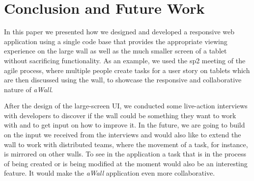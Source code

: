 \documentclass{sigchi}
\begin{document}
\section{Conclusion and Future Work}
In this paper we presented how we designed and developed a responsive web application using a single code base that provides the appropriate viewing experience on the large wall as well as the much smaller screen of a tablet without sacrificing functionality.
As an example, we used the \gls{sp2} meeting of the agile process, where multiple people create tasks for a user story on tablets which are then discussed using the wall, to showcase the responsive and collaborative nature of \textit{aWall}.

After the design of the large-screen UI, we conducted some live-action interviews with developers to discover if the wall could be something they want to work with and to get input on how to improve it.
In the future, we are going to build on the input we received from the interviews and would also like to extend the wall to work with distributed teams, where the movement of a task, for instance, is mirrored on other walls.
To see in the application a task that is in the process of being created or is being modified at the moment would also be an interesting feature.
It would make the \textit{aWall} application even more collaborative.


\balance{}



\end{document}
